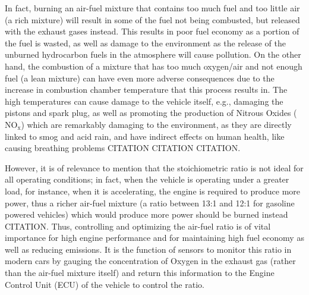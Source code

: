 \documentclass[11pt]{article}
\begin{document}
In fact, burning an air-fuel mixture that contains too much fuel and too little air (a rich mixture) will result in some of the fuel not being combusted, but released with the exhaust gases instead. This results in poor fuel economy as a portion of the fuel is wasted, as well as damage to the environment as the release of the unburned hydrocarbon fuels in the atmosphere will cause pollution. On the other hand, the combustion of a mixture that has too much oxygen/air and not enough fuel (a lean mixture) can have even more adverse consequences due to the increase in combustion chamber temperature that this process results in. The high temperatures can cause damage to the vehicle itself, e.g., damaging the pistons and spark plug, as well as promoting the production of Nitrous Oxides ($\text{NO}_{\text{x}}$)  which are remarkably damaging to the environment, as they are directly linked to smog and acid rain, and have indirect effects on human health, like causing breathing problems CITATION CITATION CITATION.

However, it is of relevance to mention that the stoichiometric ratio is not ideal for all operating conditions; in fact, when the vehicle is operating under a greater load, for instance, when it is accelerating, the engine is required to produce more power, thus a richer air-fuel mixture (a ratio between 13:1 and 12:1 for gasoline powered vehicles) which would produce more power should be burned instead CITATION. Thus, controlling and optimizing the air-fuel ratio is of vital importance for high engine performance and for maintaining high fuel economy as well as reducing emissions. It is the function of  sensors to monitor this ratio in modern cars by gauging the concentration of Oxygen in the exhaust gas (rather than the air-fuel mixture itself) and return this information to the Engine Control Unit (ECU) of the vehicle to control the ratio. 
\end{document}
